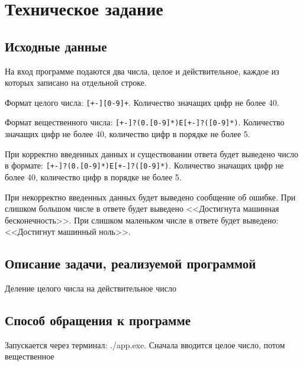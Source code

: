 \section{Техническое задание}
\subsection{Исходные данные}
	На вход программе подаются два числа, целое и действительное, каждое из которых записано на отдельной строке.\par 
	Формат целого числа: \texttt{[+-][0-9]+}. Количество значащих цифр не более 40.\par
	Формат вещественного числа: \texttt{[+-]?(0.[0-9]*)E[+-]?([0-9]*)}. Количество значащих цифр не более 40, количество цифр в порядке не более 5.\par
	При корректно введенных данных и существовании ответа будет выведено число в формате: \texttt{[+-]?(0.[0-9]*)E[+-]?([0-9]*)}. Количество значащих цифр не более 40, количество цифр в порядке не более 5.\par
	При некорректно введенных данных будет выведено сообщение об ошибке. При слишком большом числе в ответе будет выведено <<Достигнута машинная бесконечность>>. При слишком маленьком числе в ответе будет выведено: <<Достигнут машинный ноль>>.

\subsection{Описание задачи, реализуемой программой}
	Деление целого числа на действительное число

\subsection{Способ обращения к программе}
	Запускается через терминал: ./app.exe. Сначала вводится целое число, потом вещественное

